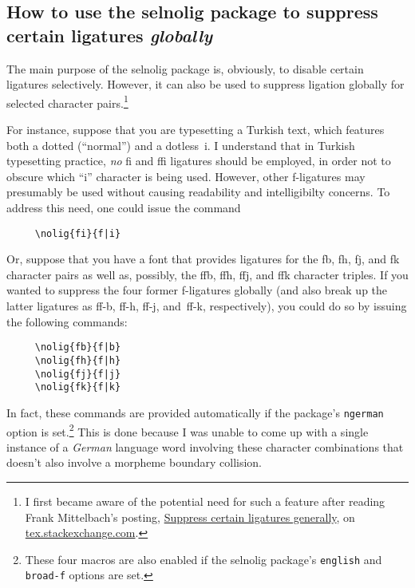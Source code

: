 \documentclass[12pt]{article}
\newcommand{\pkg}[1]{\textsf{#1}}
\newcommand{\opt}[1]{\texttt{#1}}
\begin{document}
\subsection[How to use the selnolig package to suppress certain ligatures globally]{How to use the selnolig package to suppress certain ligatures \emph{globally}}
\label{sec:global-nolig}


The main purpose of the \pkg{selnolig} package is, obviously, to disable certain ligatures selectively. However, it can also be used to suppress ligation globally for selected character pairs.\footnote{I first became aware of the potential need for such a feature after reading Frank Mittelbach's posting, \href{http://tex.stackexchange.com/q/61042/5001}{Suppress certain ligatures generally}, on \url{tex.stackexchange.com}. } 

For instance, suppose that you are typesetting a Turkish text, which features both a dotted (\enquote{normal}) and a dotless~i. I understand that in Turkish typesetting practice, \emph{no} fi and ffi ligatures should be employed, in order not to obscure which \enquote{i} character is being used. However, other f-ligatures may presumably be used without causing readability and intelligibilty concerns. To address this need, one could issue the command
\begin{Verbatim}
     \nolig{fi}{f|i}
\end{Verbatim}

\bgroup \ebg

Or, suppose that you have a font that provides ligatures for the \mbox{fb}, \mbox{fh}, \mbox{fj}, and \mbox{fk} character pairs as well as, possibly, the \mbox{ffb}, \mbox{ffh}, \mbox{ffj}, and \mbox{ffk} character triples. If you wanted to suppress the four former f-ligatures globally (and also break up the latter ligatures as ff-b, ff-h, ff-j, and~ff-k, respectively), you could do so by issuing the following commands: \egroup
\begin{Verbatim}
     \nolig{fb}{f|b}
     \nolig{fh}{f|h}
     \nolig{fj}{f|j}
     \nolig{fk}{f|k}
\end{Verbatim}
In fact, these commands are provided automatically if the package's \opt{ngerman} option is set.\footnote{These four macros are also enabled if the \pkg{selnolig} package's \opt{english} and \opt{broad-f} options are set.} This is done because I was unable to come up with a single instance of a \emph{German} language word involving these character combinations that doesn't also involve a morpheme boundary collision.
\end{document}
